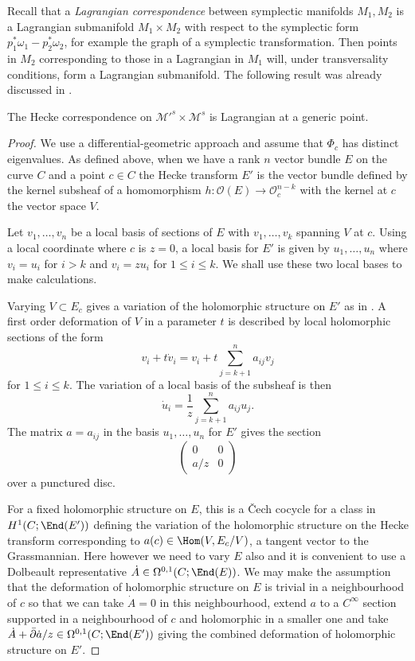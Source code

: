 Recall that a {\em Lagrangian correspondence} between symplectic manifolds $M_1,M_2$ is a Lagrangian submanifold  $ M_1\times M_2$ with respect to the symplectic form $p_1^*\omega_1-p_2^*\omega_2$, for example the graph of a symplectic transformation. Then points in $M_2$ corresponding to those in a Lagrangian in $M_1$ will, under transversality conditions, form a Lagrangian submanifold. The following result was already discussed in \cite[pp.185-186]{kapustin-witten}.

\begin{theorem}
\notready The Hecke correspondence on ${\mathcal M}'^s\times {\mathcal M}^s$ is Lagrangian at a generic point.
\end{theorem}

\begin{proof}
	We use a differential-geometric approach and assume that $\Phi_c$ has distinct eigenvalues.
	As defined above, when we have  a rank $n$ vector bundle $E$ on the curve $C$ and a point $c\in C$ the Hecke transform $E'$ is the vector bundle defined by the kernel subsheaf of a homomorphism $h: {\mathcal O}(E)\rightarrow {\mathcal O}_c^{n-k}$ with the kernel at $c$ the vector space $V$.


	Let $v_1,\dots, v_n$ be a local basis of sections of $E$  with $v_1,\dots, v_k$ spanning $V$ at $c$. Using a local coordinate where $c$ is $z=0$,  a local basis for $E'$ is given by $ u_1,\dots,  u_n$ where $v_i=u_i$ for $i>k$  and $v_i=zu_i$ for $1\le i\le k$.
	We shall use these two local bases to make calculations.

	Varying $V\subset E_c$ gives a variation of the holomorphic structure on $E'$ as in \cite{NR}.
	A first order deformation of $V$  in a parameter $t$  is described by local holomorphic sections of the form
	$$ v_i+t\dot v_i=v_i+t\sum_{j=k+1}^n a_{ij}v_j$$
	for $1\le i\le k$. The variation of a local basis of the  subsheaf is then
	$$\dot u_i=\frac{1}{z} \sum_{j=k+1}^n a_{ij}u_j.$$
	The matrix $a=a_{ij}$ in the basis $u_1,\dots, u_n$ for $E'$ gives the    section
	$$\begin{pmatrix}  0 & 0 \\
	a/z& 0\end{pmatrix}$$ over a punctured disc.

	For a fixed holomorphic structure on $E$, this is   a \v Cech
	cocycle for a class in $H^1(C;\End (E'))$ defining the variation of the holomorphic structure on the Hecke transform corresponding to $a(c)\in  \Hom(V,E_c/V)$, a tangent vector to the Grassmannian.    Here however we need to vary $E$ also and it is convenient to use
	a Dolbeault representative $\dot A\in \Omega^{0,1}(C;\End (E))$. We may make the assumption that the deformation of holomorphic structure on $E$ is trivial in a neighbourhood of $c$ so that we can take $\dot A=0$ in this neighbourhood,  extend $a$ to a $C^{\infty}$ section  supported in a neighbourhood of $c$ and holomorphic in a smaller one and take $\dot A+\bar\partial \dot a/z\in \Omega^{0,1}(C; \End (E'))$ giving the combined deformation of holomorphic structure on $E'$.



\end{proof}
